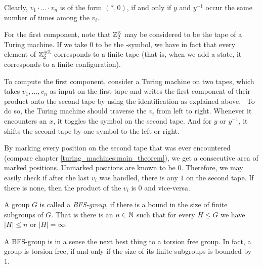	Clearly, $v_1 \cdot ... \cdot v_n$ is of the form $(*,0)$, if and only if $y$ and $y^{-1}$ occur the same number of times among the $v_i$.\footnotemark

	For the first component, note that $\mathbb{Z}_2^{\mathbb{Z}}$ may be considered to be the tape of a Turing machine.
	If we take $0$ to be the \EMP-symbol, we have in fact that every element of $\mathbb{Z}_2^{\oplus \mathbb{Z}}$ corresponds to a finite tape (that is, when we add a state, it corresponds to a finite configuration).

	To compute the first component, consider a Turing machine on two tapes, which takes $v_1,...,v_n$ as input on the first tape and writes the first component of their product onto the second tape by using the identification as explained above.\footnotemark~
	To do so, the Turing machine should traverse the $v_i$ from left to right.
	Whenever it encounters an $x$, it toggles the symbol on the second tape.
	And for $y$ or $y^{-1}$, it shifts the second tape by one symbol to the left or right.

	By marking every position on the second tape that was ever encountered (compare chapter \ref{turing_machines:main_theorem}), we get a consecutive area of marked positions.
	Unmarked positions are known to be $0$.
	Therefore, we may easily check if after the last $v_i$ was handled, there is any $1$ on the second tape. If there is none, then the product of the $v_i$ is $0$ and vice-versa.
\endproof

\begin{Definition}
	A group $G$ is called a \emph{BFS-group}, if there is a bound in the size of finite subgroups of $G$.
	That is there is an $n \in \mathbb{N}$ such that for every $H \leq G$ we have $|H| \leq n$ or $|H| = \infty$.
\end{Definition}

\begin{Remark}
	A BFS-group is in a sense the next best thing to a torsion free group.
	In fact, a group is torsion free, if and only if the size of its finite subgroups is bounded by 1.
\end{Remark}

